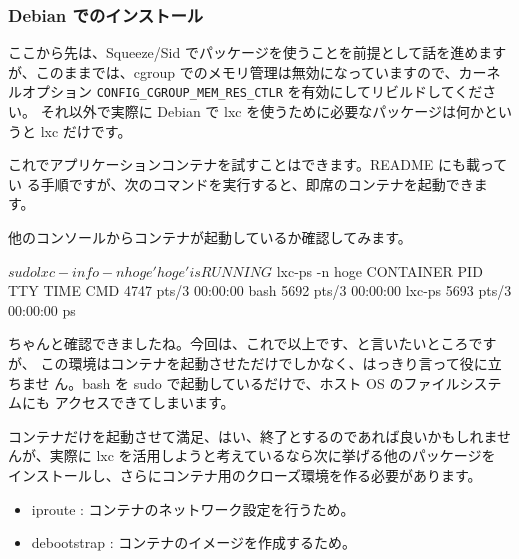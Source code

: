 \documentclass[mingoth,a4paper]{jsarticle}
\begin{document}
\subsubsection{Debian でのインストール}

ここから先は、Squeeze/Sid でパッケージを使うことを前提として話を進めます
が、このままでは、cgroup でのメモリ管理は無効になっていますので、カーネ
ルオプション \verb!CONFIG_CGROUP_MEM_RES_CTLR! を有効にしてリビルドしてください。
それ以外で実際に Debian で lxc を使うために必要なパッケージは何かというと
lxc だけです。


これでアプリケーションコンテナを試すことはできます。README にも載ってい
る手順ですが、次のコマンドを実行すると、即席のコンテナを起動できます。


他のコンソールからコンテナが起動しているか確認してみます。

\begin{commandline}
$ sudo lxc-info -n hoge
'hoge' is RUNNING
$ lxc-ps -n hoge 
CONTAINER    PID TTY          TIME CMD
            4747 pts/3    00:00:00 bash
            5692 pts/3    00:00:00 lxc-ps
            5693 pts/3    00:00:00 ps
\end{commandline}

ちゃんと確認できましたね。今回は、これで以上です、と言いたいところですが、
この環境はコンテナを起動させただけでしかなく、はっきり言って役に立ちませ
ん。bash を sudo で起動しているだけで、ホスト OS のファイルシステムにも
アクセスできてしまいます。

コンテナだけを起動させて満足、はい、終了とするのであれば良いかもしれませ
んが、実際に lxc を活用しようと考えているなら次に挙げる他のパッケージを
インストールし、さらにコンテナ用のクローズ環境を作る必要があります。

\begin{itemize}
 \item iproute : コンテナのネットワーク設定を行うため。
 \item debootstrap : コンテナのイメージを作成するため。
\end{itemize}
\end{document}
